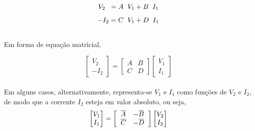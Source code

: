 \documentclass{article}
\numberwithin{equation}{section}
\begin{document}
    \begin{equation*}
        V_{2} \hspace{0.2cm} =A \hspace{0.2cm} V_{1}+ B \hspace{0.2cm} I_{1}
    \end{equation*}
    \begin{equation*}
        -I_{2}=C \hspace{0.2cm} V_{1}+D \hspace{0.2cm} I_{1}
    \end{equation*}\\
    Em forma de equação matricial,

    \begin{equation}
        \begin{bmatrix}
            V_{2} \\
            -I_{2}
        \end{bmatrix}
        = %
        \begin{bmatrix}
            A & B \\
            C & D
        \end{bmatrix}
        \begin{bmatrix}
            V_{1} \\
            I_{1}
        \end{bmatrix}
    \end{equation}
    \\
    Em alguns casos, alternativamente, representa-se $V_{1}$ e $I_{1}$ como funções de $V_{2}$ e $I_{2}$, de modo que a corrente $I_{2}$ esteja em valor absoluto, ou seja,
    \begin{equation*}
        \begin{bmatrix}
            V_{1} \\
            I_{1}
        \end{bmatrix}
        = %
        \begin{bmatrix}
            \hspace{0.2cm} \overline{A} & -\overline{B} \hspace{0.2cm} \\
            \hspace{0.2cm} \overline{C} & -\overline{D} \hspace{0.2cm}
        \end{bmatrix}
        \begin{bmatrix}
            V_{2} \\
            I_{2}
        \end{bmatrix}
    \end{equation*}
\end{document}
